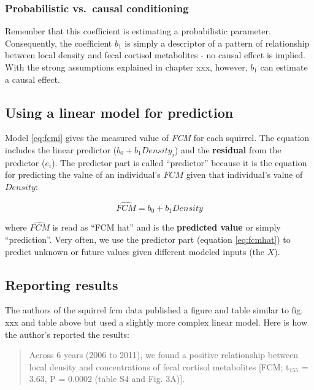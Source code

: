 \documentclass[]{book}
\begin{document}
\subsubsection{Probabilistic vs.~causal
conditioning}\label{probabilistic-vs.causal-conditioning}

Remember that this coefficient is estimating a probabilistic parameter.
Consequently, the coefficient \(b_1\) is simply a descriptor of a
pattern of relationship between local density and fecal cortisol
metabolites - no causal effect is implied. With the strong assumptions
explained in chapter xxx, however, \(b_1\) can estimate a causal effect.

\subsection{Using a linear model for
prediction}\label{using-a-linear-model-for-prediction}

Model \eqref{eq:fcmi} gives the measured value of \emph{FCM} for each
squirrel. The equation includes the linear predictor
(\(b_0 + b_1 Density_i\)) and the \textbf{residual} from the predictor
(\(e_i\)). The predictor part is called ``predictor'' because it is the
equation for predicting the value of an individual's \(FCM\) given that
individual's value of \(Density\):

\begin{equation}
\widehat{FCM} = b_0 + b_1 Density
\label{eq:fcmhat}
\end{equation}

where \(\widehat{FCM}\) is read as ``FCM hat'' and is the
\textbf{predicted value} or simply ``prediction''. Very often, we use
the predictor part (equation \eqref{eq:fcmhat}) to predict unknown or
future values given different modeled inputs (the \(X\)).

\subsection{Reporting results}\label{reporting-results}

The authors of the squirrel fcm data published a figure and table
similar to fig. xxx and table above but used a slightly more complex
linear model. Here is how the author's reported the results:

\begin{quote}
Across 6 years (2006 to 2011), we found a positive relationship between
local density and concentrations of fecal cortisol metabolites {[}FCM;
t\(_155\) = 3.63, P = 0.0002 (table S4 and Fig. 3A){]}.
\end{quote}
\end{document}
